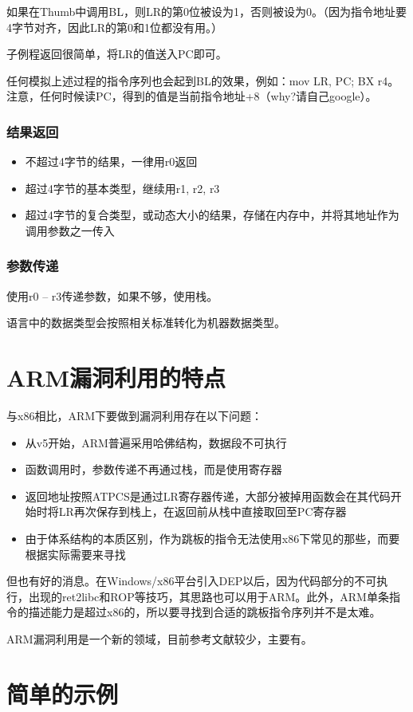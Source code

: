 如果在Thumb中调用BL，则LR的第0位被设为1，否则被设为0。（因为指令地址要4字节对齐，因此LR的第0和1位都没有用。）

子例程返回很简单，将LR的值送入PC即可。

任何模拟上述过程的指令序列也会起到BL的效果，例如：mov LR, PC; BX r4。注意，任何时候读PC，得到的值是当前指令地址+8（why?请自己google）。

\subsubsection{结果返回}
\begin{itemize}
\item 不超过4字节的结果，一律用r0返回
\item 超过4字节的基本类型，继续用r1, r2, r3
\item 超过4字节的复合类型，或动态大小的结果，存储在内存中，并将其地址作为调用参数之一传入
\end{itemize}
\subsubsection{参数传递}

使用r0 – r3传递参数，如果不够，使用栈。

语言中的数据类型会按照相关标准转化为机器数据类型。
\section{ARM漏洞利用的特点}
与x86相比，ARM下要做到漏洞利用存在以下问题：
\begin{itemize}
\item 从v5开始，ARM普遍采用哈佛结构，数据段不可执行
\item 函数调用时，参数传递不再通过栈，而是使用寄存器
\item 返回地址按照ATPCS是通过LR寄存器传递，大部分被掉用函数会在其代码开始时将LR再次保存到栈上，在返回前从栈中直接取回至PC寄存器
\item 由于体系结构的本质区别，作为跳板的指令无法使用x86下常见的那些，而要根据实际需要来寻找
\end{itemize}
但也有好的消息。在Windows/x86平台引入DEP以后，因为代码部分的不可执行，出现的ret2libc和ROP等技巧，其思路也可以用于ARM。此外，ARM单条指令的描述能力是超过x86的，所以要寻找到合适的跳板指令序列并不是太难。

ARM漏洞利用是一个新的领域，目前参考文献较少，主要有\cite{arm_exploiting_linux, arm_stack_exploitation, arm_exploitation, arm_ropmap, arm_alphanumeric}。
\section{简单的示例}
